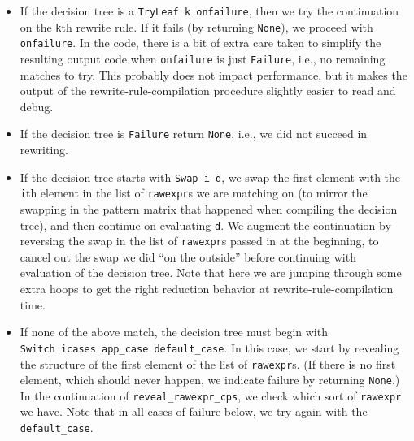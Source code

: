 \documentclass[
]{article}
\providecommand{\tightlist}{%
  \setlength{\itemsep}{0pt}\setlength{\parskip}{0pt}}
\begin{document}
\begin{itemize}
\begin{itemize}
\begin{itemize}
      \begin{itemize}
      \tightlist
      \item
        If the decision tree is a \texttt{TryLeaf\ k\ onfailure}, then
        we try the continuation on the \texttt{k}th rewrite rule. If it
        fails (by returning \texttt{None}), we proceed with
        \texttt{onfailure}. In the code, there is a bit of extra care
        taken to simplify the resulting output code when
        \texttt{onfailure} is just \texttt{Failure}, i.e., no remaining
        matches to try. This probably does not impact performance, but
        it makes the output of the rewrite-rule-compilation procedure
        slightly easier to read and debug.
      \item
        If the decision tree is \texttt{Failure} return \texttt{None},
        i.e., we did not succeed in rewriting.
      \item
        If the decision tree starts with
        \texttt{Swap\ i\ d\textquotesingle{}}, we swap the first element
        with the \texttt{i}th element in the list of \texttt{rawexpr}s
        we are matching on (to mirror the swapping in the pattern matrix
        that happened when compiling the decision tree), and then
        continue on evaluating \texttt{d\textquotesingle{}}. We augment
        the continuation by reversing the swap in the list of
        \texttt{rawexpr}s passed in at the beginning, to cancel out the
        swap we did ``on the outside'' before continuing with evaluation
        of the decision tree. Note that here we are jumping through some
        extra hoops to get the right reduction behavior at
        rewrite-rule-compilation time.
      \item
        If none of the above match, the decision tree must begin with
        \texttt{Switch\ icases\ app\_case\ default\_case}. In this case,
        we start by revealing the structure of the first element of the
        list of \texttt{rawexpr}s. (If there is no first element, which
        should never happen, we indicate failure by returning
        \texttt{None}.) In the continuation of
        \texttt{reveal\_rawexpr\_cps}, we check which sort of
        \texttt{rawexpr} we have. Note that in all cases of failure
        below, we try again with the \texttt{default\_case}.


\end{itemize}
\end{itemize}
\end{itemize}
\end{itemize}
\end{document}
